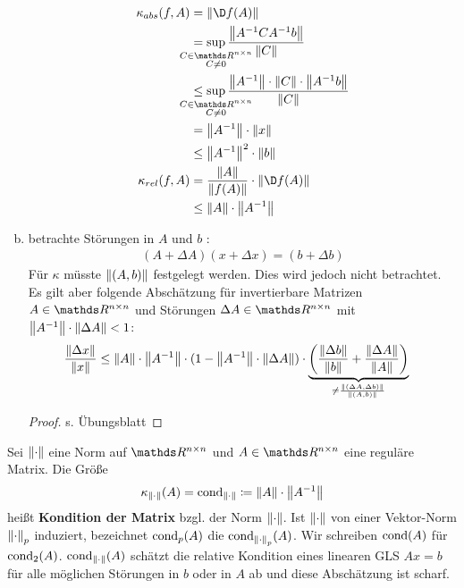 \begin{Bspe}
\begin{enumerate}[a)]
    \begin{align}
      \nonumber
      \kappa_{abs} (f,A) 
      &= \nn{\D f(A)} \\ \nonumber
      &= \sup_{\mathclap{\substack{
        C \in \R^{n\times n} \\
        C\neq 0								  	
      }}}
      \frac{\nn{A^{-1}CA^{-1}b}}{\nn{C}} \\ \nonumber
      &\leq \sup_{\mathclap{\substack{ 
        C \in \R^{n\times n}\\
        C \neq 0
      }}}
      \frac{\nn{A^{-1}}\cdot\nn{C}\cdot\nn{A^{-1}b}}{\nn{C}} \\ \nonumber
                         &= \nn{A^{-1}} \cdot\nn{x} \\ \nonumber
                         &\leq   \nn{A^{-1}}^2 \cdot\nn{b} \\ \nonumber
      \kappa_{rel}(f,A)  &= \frac{\nn{A}}{\nn{f(A)}} \cdot \nn{\D f(A)} \\
                         &\leq \nn{A}\cdot \nn{A^{-1}} \label{III.2.10}
    \end{align}
  \item betrachte Störungen in $A$ und $b$ :
    \begin{gather*}
      (A+\Delta A)(x+\Delta x) = (b+\Delta b) 
    \end{gather*}
    Für $\kappa$ müsste $\left\| (A,b) \right\|$ festgelegt werden. Dies wird jedoch nicht betrachtet. Es gilt aber folgende Abschätzung für invertierbare Matrizen $A\in \Renn $ und Störungen
    $\Delta A \in \R^{n\times n}$ mit $\left\| A^{-1} \right\|\cdot \left\| \Delta A \right\| < 1$:
    \begin{align}
      \frac{\left\| \Delta x \right\|}{\left\| x \right\|} & \leq \left\| A \right\| \cdot \left\| A^{-1} \right\|\cdot (1- \left\| A^{-1} \right\|\cdot \left\| \Delta A \right\|) 
                                   \cdot
                                   \underbrace{\left(  \frac{\left\| \Delta b \right\|}{\left\| b \right\|} +  \frac{\left\| \Delta A \right\|}{\left\| A \right\|}  \right)}_{\neq  \frac{\left\| (\Delta A, \Delta b) \right\|}{\left\| (A,b) \right\|} }
                                   \label{III.2.11}
    \end{align}
    \begin{proof} s. Übungsblatt \end{proof}
  \end{enumerate}
\end{Bspe}

\begin{Defe}
  Sei $\left\| \cdot \right\|$ eine Norm auf $\R^{n\times n} $ und $A\in \R^{n\times n}$ eine reguläre Matrix.
  Die Größe
  \begin{gather*}
    \kappa_{\left\| \cdot \right\|}(A) = \operatorname{cond}_{\left\| \cdot \right\|} \coloneqq \left\| A \right\| \cdot \left\| A^{-1} \right\|
  \end{gather*}
  heißt \textbf{Kondition der Matrix} bzgl. der Norm ${\left\| \cdot \right\|}$.
  Ist  ${\left\| \cdot \right\|}$ von einer Vektor-Norm ${\left\| \cdot \right\|}_p$ induziert,
  bezeichnet $\operatorname{cond}_p(A)$ die $\operatorname{cond}_{\left\| \cdot \right\|_p}(A)$. 
  Wir schreiben $\operatorname{cond}(A)$ für $\operatorname{cond}_2(A)$.
  $\operatorname{cond}_{\left\| \cdot \right\|}(A) $ schätzt die relative Kondition 
  eines linearen GLS $Ax=b$ für alle möglichen 
  Störungen in $b$ oder in $A$ ab und diese Abschätzung ist scharf.
\end{Defe}

